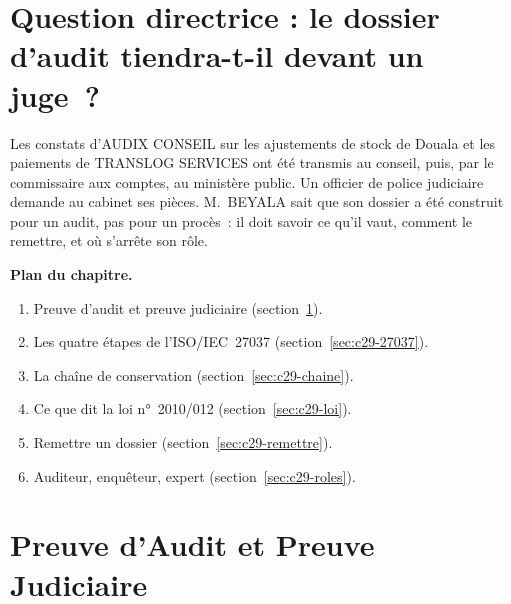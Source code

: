 \bigskip

\section*{Question directrice : le dossier d'audit tiendra-t-il devant un juge~?}

Les constats d'AUDIX CONSEIL sur les ajustements de stock de Douala et les
paiements de TRANSLOG SERVICES ont été transmis au conseil, puis, par le
commissaire aux comptes, au ministère public. Un officier de police
judiciaire demande au cabinet ses pièces. M.~BEYALA sait que son dossier a
été construit pour un audit, pas pour un procès~: il doit savoir ce qu'il
vaut, comment le remettre, et où s'arrête son rôle.

\medskip
\textbf{Plan du chapitre.}
\begin{enumerate}
    \item Preuve d'audit et preuve judiciaire (section~\ref{sec:c29-deux}).
    \item Les quatre étapes de l'ISO/IEC~27037 (section~\ref{sec:c29-27037}).
    \item La chaîne de conservation (section~\ref{sec:c29-chaine}).
    \item Ce que dit la loi n°~2010/012 (section~\ref{sec:c29-loi}).
    \item Remettre un dossier (section~\ref{sec:c29-remettre}).
    \item Auditeur, enquêteur, expert (section~\ref{sec:c29-roles}).
\end{enumerate}

\separateur

\section{Preuve d'Audit et Preuve Judiciaire}
\label{sec:c29-deux}

